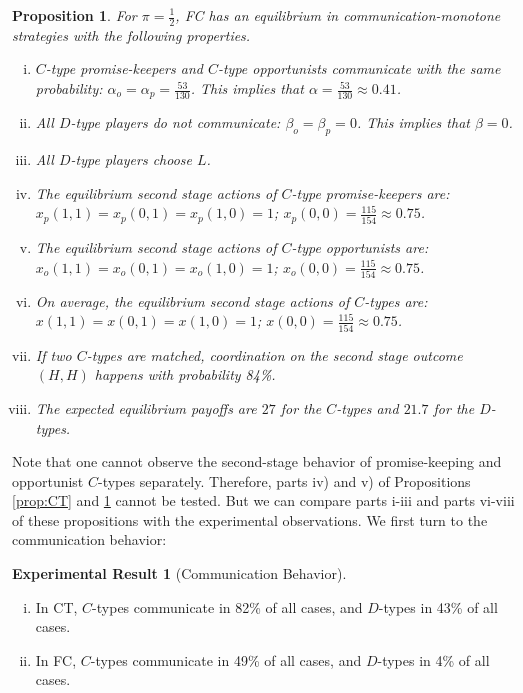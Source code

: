 \documentclass[12pt]{article}
\newtheorem{proposition}{Proposition} \theoremstyle{definition}
\theoremstyle{break}
\newtheorem{result}{Experimental Result}\theoremstyle{break}
\begin{document}
\begin{proposition}\label{prop:FC}
	For $\pi=\frac{1}{2}$, FC has an equilibrium in communication-monotone strategies with the following properties.
	\begin{enumerate}[i)]\setlength\itemsep{0em}
		\item $C$-type promise-keepers and $C$-type opportunists communicate with the same probability: $\alpha_o=\alpha_p=\frac{53}{130}$. This implies that $\alpha=\frac{53}{130}\approx 0.41$.
		\item All $D$-type players do not communicate: $\beta_o=\beta_p=0$. This implies that $\beta=0$.
		\item All $D$-type players choose $L$.
		\item The equilibrium second stage actions of $C$-type promise-keepers are:  $x_p(1,1)=x_p(0,1)=x_p(1,0)=1$; $x_p(0,0)=\frac{115}{154}\approx 0.75$.
		\item The equilibrium second stage actions of $C$-type opportunists are:  \\$x_o(1,1)=x_o(0,1)=x_o(1,0)=1$;  $x_o(0,0)=\frac{115}{154}\approx 0.75$.
		\item  On average, the equilibrium second stage actions of $C$-types are:  $x(1,1)=x(0,1)=x(1,0)=1$;  $x(0,0)=\frac{115}{154}\approx 0.75$.
		\item If two $C$-types are matched, coordination on the second stage outcome $(H,H)$ happens with probability 84\%.
		\item The expected equilibrium payoffs are $27$ for the $C$-types and $21.7$ for the $D$-types.
	\end{enumerate}
\end{proposition}
%
Note that one cannot observe the second-stage behavior of promise-keeping and opportunist $C$-types separately. Therefore, parts iv) and v) of Propositions \ref{prop:CT} and \ref{prop:FC} cannot be tested. But we can compare parts i-iii and parts vi-viii of these propositions with the experimental observations. We first turn to the communication behavior:


\begin{result}[Communication Behavior]
	\begin{enumerate}[i)]\setlength\itemsep{0em}
		\item In CT, $C$-types communicate in 82\% of all cases, and $D$-types in 43\% of all cases.
		\item In FC, $C$-types communicate in 49\% of all cases, and $D$-types in 4\% of all cases.
	\end{enumerate}
\end{result}
\end{document}
